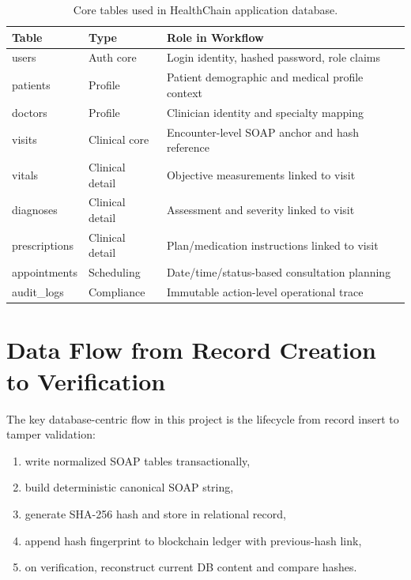 \documentclass[12pt,a4paper]{report}
\begin{document}
\begin{table}[htbp]
\centering
\caption{Core tables used in HealthChain application database.}
\label{tab:core-database-tables}
\begin{tabular}{p{} p{} p{}}
\toprule
\textbf{Table} & \textbf{Type} & \textbf{Role in Workflow} \\
\midrule
users & Auth core & Login identity, hashed password, role claims \\
patients & Profile & Patient demographic and medical profile context \\
doctors & Profile & Clinician identity and specialty mapping \\
visits & Clinical core & Encounter-level SOAP anchor and hash reference \\
vitals & Clinical detail & Objective measurements linked to visit \\
diagnoses & Clinical detail & Assessment and severity linked to visit \\
prescriptions & Clinical detail & Plan/medication instructions linked to visit \\
appointments & Scheduling & Date/time/status-based consultation planning \\
audit\_logs & Compliance & Immutable action-level operational trace \\
\bottomrule
\end{tabular}
\end{table}

\section{Data Flow from Record Creation to Verification}

The key database-centric flow in this project is the lifecycle from record insert to tamper validation:

\begin{enumerate}
\item write normalized SOAP tables transactionally,
\item build deterministic canonical SOAP string,
\item generate SHA-256 hash and store in relational record,
\item append hash fingerprint to blockchain ledger with previous-hash link,
\item on verification, reconstruct current DB content and compare hashes.
\end{enumerate}
\end{document}
